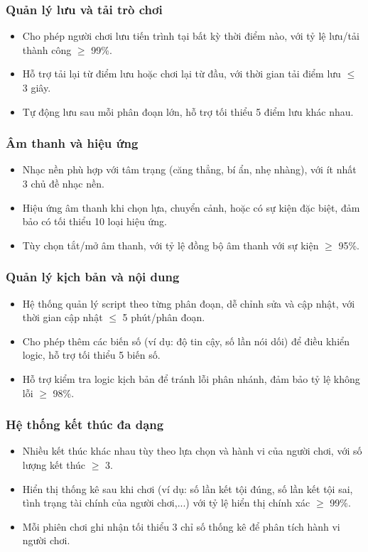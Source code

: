 \subsubsection{Quản lý lưu và tải trò chơi}
\begin{itemize}
    \item Cho phép người chơi lưu tiến trình tại bất kỳ thời điểm nào, với tỷ lệ lưu/tải thành công $\geq$ 99\%.
    \item Hỗ trợ tải lại từ điểm lưu hoặc chơi lại từ đầu, với thời gian tải điểm lưu $\leq$ 3 giây.
    \item Tự động lưu sau mỗi phân đoạn lớn, hỗ trợ tối thiểu 5 điểm lưu khác nhau.
\end{itemize}

\subsubsection{Âm thanh và hiệu ứng}
\begin{itemize}
    \item Nhạc nền phù hợp với tâm trạng (căng thẳng, bí ẩn, nhẹ nhàng), với ít nhất 3 chủ đề nhạc nền.
    \item Hiệu ứng âm thanh khi chọn lựa, chuyển cảnh, hoặc có sự kiện đặc biệt, đảm bảo có tối thiểu 10 loại hiệu ứng.
    \item Tùy chọn tắt/mở âm thanh, với tỷ lệ đồng bộ âm thanh với sự kiện $\geq$ 95\%.
\end{itemize}

\subsubsection{Quản lý kịch bản và nội dung}
\begin{itemize}
    \item Hệ thống quản lý script theo từng phân đoạn, dễ chỉnh sửa và cập nhật, với thời gian cập nhật $\leq$ 5 phút/phân đoạn.
    \item Cho phép thêm các biến số (ví dụ: độ tin cậy, số lần nói dối) để điều khiển logic, hỗ trợ tối thiểu 5 biến số.
    \item Hỗ trợ kiểm tra logic kịch bản để tránh lỗi phân nhánh, đảm bảo tỷ lệ không lỗi $\geq$ 98\%.
\end{itemize}

\subsubsection{Hệ thống kết thúc đa dạng}
\begin{itemize}
    \item Nhiều kết thúc khác nhau tùy theo lựa chọn và hành vi của người chơi, với số lượng kết thúc $\geq$ 3.
    \item Hiển thị thống kê sau khi chơi (ví dụ: số lần kết tội đúng, số lần kết tội sai, tình trạng tài chính của người chơi,...) với tỷ lệ hiển thị chính xác $\geq$ 99\%.
    \item Mỗi phiên chơi ghi nhận tối thiểu 3 chỉ số thống kê để phân tích hành vi người chơi.
\end{itemize}

